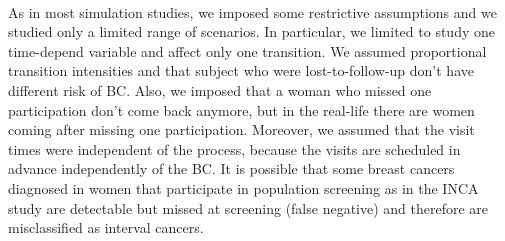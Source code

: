 % 
% 
% 


\paragraph{}As in most simulation studies, we imposed some restrictive assumptions and we studied
only a limited range of scenarios. In particular, we limited to study one time-depend variable and
affect only one transition. We assumed proportional transition intensities and that subject who
were lost-to-follow-up don't have different risk of BC. Also, we imposed that a woman who missed
one participation don't come back anymore, but in the real-life there are women coming after
missing one participation. Moreover, we assumed that the visit times were independent of the
process, because the visits are scheduled in advance independently of the BC. It is possible that
some breast cancers diagnosed in women that participate in population screening as in the INCA
study are detectable but missed at screening (false negative) and therefore are misclassified as
interval cancers.


